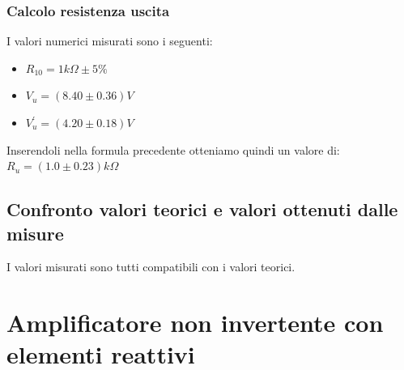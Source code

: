 \documentclass{article}
\begin{document}
\subsubsection{Calcolo resistenza uscita}
I valori numerici misurati sono i seguenti:
\begin{itemize}
	\item \large $R_{10} = 1k\Omega \pm 5\%$
	\item \large $V_{u} = (8.40 \pm 0.36)V$
	\item \large $V_{u}^{'} = (4.20 \pm 0.18)V$
\end{itemize}
Inserendoli nella formula precedente otteniamo quindi un valore di: \\ \large $R_{u} = (1.0 \pm 0.23)k\Omega$

\subsection{Confronto valori teorici e valori ottenuti dalle misure}
I valori misurati sono tutti compatibili con i valori teorici.

\section{Amplificatore non invertente con elementi reattivi}
\end{document}
